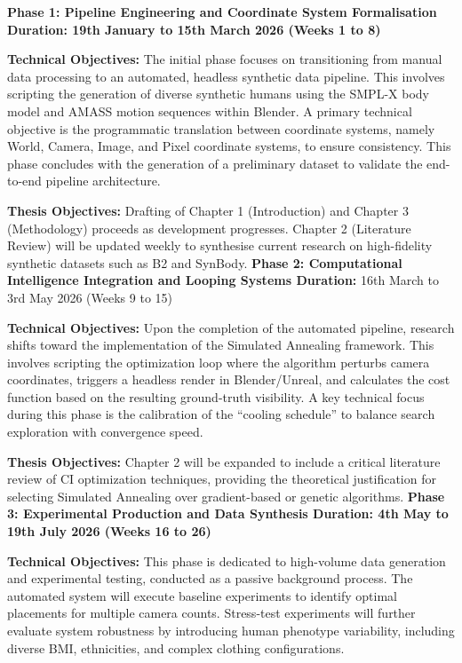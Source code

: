 \label{sec:proposedresearchplan:}
\newline
\textbf{Phase 1: Pipeline Engineering and Coordinate System Formalisation Duration: 19th January to 15th March 2026 (Weeks 1 to 8)} 

\textbf{Technical Objectives:} The initial phase focuses on transitioning from manual data processing to an automated, headless synthetic data pipeline. This involves scripting the generation of diverse synthetic humans using the SMPL-X body model and AMASS motion sequences within Blender. A primary technical objective is the programmatic translation between coordinate systems, namely World, Camera, Image, and Pixel coordinate systems, to ensure consistency. This phase concludes with the generation of a preliminary dataset to validate the end-to-end pipeline architecture. 

\textbf{Thesis Objectives:} Drafting of Chapter 1 (Introduction) and Chapter 3 (Methodology) proceeds as development progresses. Chapter 2 (Literature Review) will be updated weekly to synthesise current research on high-fidelity synthetic datasets such as B2 and SynBody.
\newline
\textbf{Phase 2: Computational Intelligence Integration and Looping Systems Duration:} 16th March to 3rd May 2026 (Weeks 9 to 15)

\textbf{Technical Objectives:} Upon the completion of the automated pipeline, research shifts toward the implementation of the Simulated Annealing framework. This involves scripting the optimization loop where the algorithm perturbs camera coordinates, triggers a headless render in Blender/Unreal, and calculates the cost function based on the resulting ground-truth visibility. A key technical focus during this phase is the calibration of the ``cooling schedule'' to balance search exploration with convergence speed. 

\textbf{Thesis Objectives:} Chapter 2 will be expanded to include a critical literature review of CI optimization techniques, providing the theoretical justification for selecting Simulated Annealing over gradient-based or genetic algorithms.
\newline
\textbf{Phase 3: Experimental Production and Data Synthesis Duration: 4th May to 19th July 2026 (Weeks 16 to 26)} 

\textbf{Technical Objectives:} This phase is dedicated to high-volume data generation and experimental testing, conducted as a passive background process. The automated system will execute baseline experiments to identify optimal placements for multiple camera counts. Stress-test experiments will further evaluate system robustness by introducing human phenotype variability, including diverse BMI, ethnicities, and complex clothing configurations. 

